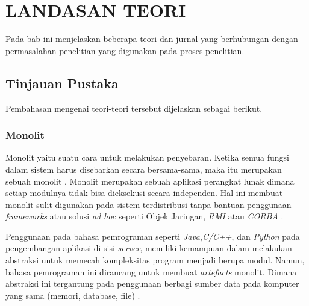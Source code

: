 \chapter{LANDASAN TEORI}
\vspace{4.5pt}
Pada bab ini menjelaskan beberapa teori dan jurnal yang berhubungan dengan permasalahan penelitian yang digunakan pada proses penelitian.
\section{Tinjauan Pustaka}
Pembahasan mengenai teori-teori tersebut dijelaskan sebagai berikut.
\subsection{Monolit}
Monolit yaitu suatu cara untuk melakukan penyebaran. Ketika semua fungsi dalam sistem harus disebarkan secara bersama-sama, maka itu merupakan sebuah monolit \cite{6}. Monolit merupakan sebuah aplikasi perangkat lunak dimana setiap modulnya tidak bisa dieksekusi secara independen. Hal ini membuat monolit sulit digunakan pada sistem terdistribusi tanpa bantuan penggunaan \textit{frameworks} atau solusi \textit{ad hoc} seperti Objek Jaringan, \textit{RMI} atau \textit{CORBA} \cite{16}.

Penggunaan pada bahasa pemrograman seperti \textit{Java},\textit{C/C++}, dan \textit{Python} pada pengembangan aplikasi di sisi \textit{server}, memiliki kemampuan dalam melakukan abstraksi untuk memecah kompleksitas program menjadi berupa modul. Namun, bahasa pemrograman ini dirancang untuk membuat \textit{artefacts} monolit. Dimana abstraksi ini tergantung pada penggunaan berbagi sumber data pada komputer yang sama (memori, database, file) \cite{16}.


